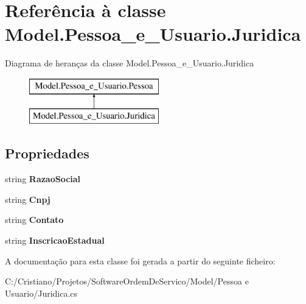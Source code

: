 \hypertarget{class_model_1_1_pessoa__e___usuario_1_1_juridica}{}\section{Referência à classe Model.\+Pessoa\+\_\+e\+\_\+\+Usuario.\+Juridica}
\label{class_model_1_1_pessoa__e___usuario_1_1_juridica}
Diagrama de heranças da classe Model.\+Pessoa\+\_\+e\+\_\+\+Usuario.\+Juridica\begin{figure}[H]
\begin{center}
\leavevmode
\includegraphics[height=2.000000cm]{class_model_1_1_pessoa__e___usuario_1_1_juridica}
\end{center}
\end{figure}
\subsection*{Propriedades}
\begin{DoxyCompactItemize}
\item 
\hypertarget{class_model_1_1_pessoa__e___usuario_1_1_juridica_a51ed47e7767ea639a4631811968b2917}{}string {\bfseries Razao\+Social}\label{class_model_1_1_pessoa__e___usuario_1_1_juridica_a51ed47e7767ea639a4631811968b2917}

\item 
\hypertarget{class_model_1_1_pessoa__e___usuario_1_1_juridica_a56cf8933a76cdc033f957eb2863963b7}{}string {\bfseries Cnpj}\label{class_model_1_1_pessoa__e___usuario_1_1_juridica_a56cf8933a76cdc033f957eb2863963b7}

\item 
\hypertarget{class_model_1_1_pessoa__e___usuario_1_1_juridica_a284c0f5d214e60939d8418c793ca798d}{}string {\bfseries Contato}\label{class_model_1_1_pessoa__e___usuario_1_1_juridica_a284c0f5d214e60939d8418c793ca798d}

\item 
\hypertarget{class_model_1_1_pessoa__e___usuario_1_1_juridica_ae9b2c1e10ba35a555be2991a8b18892f}{}string {\bfseries Inscricao\+Estadual}\label{class_model_1_1_pessoa__e___usuario_1_1_juridica_ae9b2c1e10ba35a555be2991a8b18892f}

\end{DoxyCompactItemize}


A documentação para esta classe foi gerada a partir do seguinte ficheiro\+:\begin{DoxyCompactItemize}
\item 
C\+:/\+Cristiano/\+Projetos/\+Software\+Ordem\+De\+Servico/\+Model/\+Pessoa e Usuario/Juridica.\+cs\end{DoxyCompactItemize}

